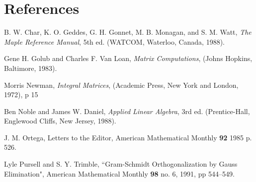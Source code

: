 \section{References}
B. W. Char, K. O. Geddes, G. H. Gonnet, M. B.
Monagan, and S. M. Watt, {\sl The
Maple Reference Manual}, 5th ed. (WATCOM, Waterloo,
Canada, 1988).

Gene H. Golub and Charles F. Van Loan, {\sl Matrix Computations},
(Johns Hopkins, Baltimore, 1983).

Morris Newman, {\sl Integral Matrices},  (Academic Press, New York
and London,  1972),  p 15

Ben Noble and James W. Daniel, {\sl Applied Linear
Algebra}, 3rd ed. (Prentice-Hall,
Englewood Cliffs, New Jersey, 1988).

J. M. Ortega, Letters to the Editor, American Mathematical
Monthly {\bf 92} 1985 p. 526.

Lyle Pursell and S. Y. Trimble, ``Gram-Schmidt
Orthogonalization by Gauss Elimination", American Mathematical
Monthly {\bf 98} no. 6, 1991, pp 544--549.

\bye